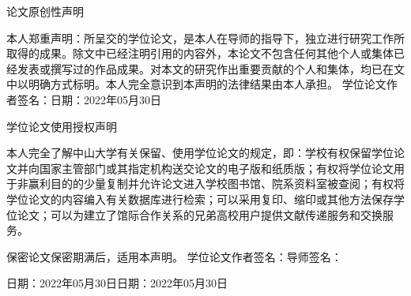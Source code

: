 \begin{center}
	\vspace*{20pt}
	\heiti 论文原创性声明
\end{center}
\fontsize{15}{20}\selectfont

本人郑重声明：所呈交的学位论文，是本人在导师的指导下，独立进行研究工作所取得的成果。除文中已经注明引用的内容外，本论文不包含任何其他个人或集体已经发表或撰写过的作品成果。对本文的研究作出重要贡献的个人和集体，均已在文中以明确方式标明。本人完全意识到本声明的法律结果由本人承担。
\vskip 20pt
\noindent
学位论文作者签名：\qquad\qquad\qquad\qquad 日期：2022年05月30日

\vskip 70pt

\begin{center}
	{\heiti 学位论文使用授权声明}
\end{center}

本人完全了解中山大学有关保留、使用学位论文的规定，即：学校有权保留学位论文并向国家主管部门或其指定机构送交论文的电子版和纸质版；有权将学位论文用于非赢利目的的少量复制并允许论文进入学校图书馆、院系资料室被查阅；有权将学位论文的内容编入有关数据库进行检索；可以采用复印、缩印或其他方法保存学位论文；可以为建立了馆际合作关系的兄弟高校用户提供文献传递服务和交换服务。

保密论文保密期满后，适用本声明。
\vskip 20pt
\noindent
学位论文作者签名：\qquad\qquad\qquad\qquad 导师签名：

\noindent
日期：2022年05月30日\qquad\qquad\qquad 日期：2022年05月30日

\endinput